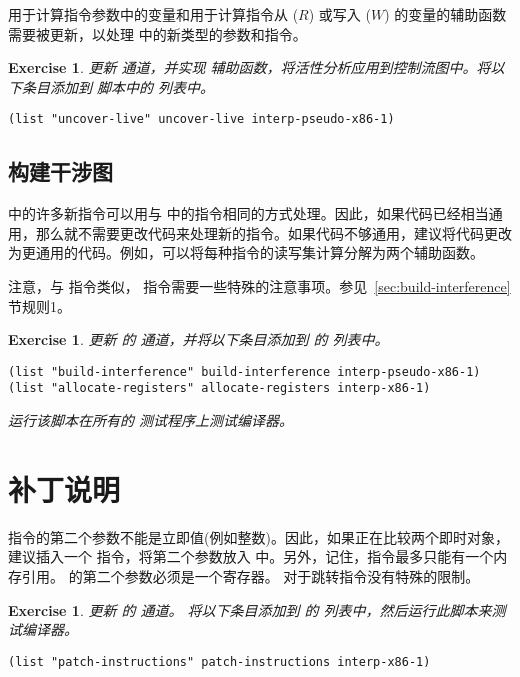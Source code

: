 \documentclass[11pt]{book}
\newtheorem{exercise}[theorem]{Exercise}
\begin{document}
用于计算指令参数中的变量和用于计算指令从 ($R$)
或写入 ($W$) 的变量的辅助函数需要被更新，以处理 \LangXIfVar{} 中的新类型的参数和指令。

\begin{exercise}\normalfont
更新  通道，并实现
 辅助函数，将活性分析应用到控制流图中。将以下条目添加到
  脚本中的  列表中。
\begin{lstlisting}
(list "uncover-live" uncover-live interp-pseudo-x86-1)
\end{lstlisting}
\end{exercise}

\subsection{构建干涉图}
\label{sec:build-interference-Rif}

 \LangXIfVar{} 中的许多新指令可以用与 \LangXVar{} 中的指令相同的方式处理。因此，如果代码已经相当通用，那么就不需要更改代码来处理新的指令。如果代码不够通用，建议将代码更改为更通用的代码。例如，可以将每种指令的读写集计算分解为两个辅助函数。

注意，与  指令类似，  指令需要一些特殊的注意事项。参见~\ref{sec:build-interference} 节规则1。

\begin{exercise}\normalfont
更新 \LangXIfVar{} 的  通道，并将以下条目添加到  的  列表中。
\begin{lstlisting}
(list "build-interference" build-interference interp-pseudo-x86-1)
(list "allocate-registers" allocate-registers interp-x86-1)
\end{lstlisting}
运行该脚本在所有的 \LangIf{} 测试程序上测试编译器。
\end{exercise}


\section{补丁说明}

  指令的第二个参数不能是立即值(例如整数)。因此，如果正在比较两个即时对象，建议插入一个  指令，将第二个参数放入  中。另外，记住，指令最多只能有一个内存引用。
%
  的第二个参数必须是一个寄存器。
%
对于跳转指令没有特殊的限制。

\begin{exercise}\normalfont
%
更新 \LangXIfVar{} 的  通道。
%  
将以下条目添加到  的  列表中，然后运行此脚本来测试编译器。
\begin{lstlisting}
(list "patch-instructions" patch-instructions interp-x86-1)
\end{lstlisting}
\end{exercise}
\end{document}
